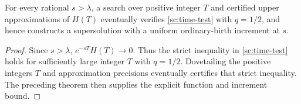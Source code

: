 \begin{corollary}
\label{sc:complete-lambda}
For every rational $s>\lambda$, a search over positive integer $T$ and
certified upper approximations of $H(T)$ eventually verifies
\eqref{sc:time-test} with $q=1/2$, and hence constructs a supersolution
with a uniform
ordinary-birth increment at $s$.
\end{corollary}
\begin{proof}
Since $s>\lambda$, $e^{-sT}H(T)\to0$.  Thus the strict inequality in
\eqref{sc:time-test} holds for sufficiently large integer $T$ with
$q=1/2$.  Dovetailing the positive integers $T$ and approximation
precisions eventually certifies that strict inequality.  The preceding
theorem then supplies the explicit function and increment bound.
\end{proof}

